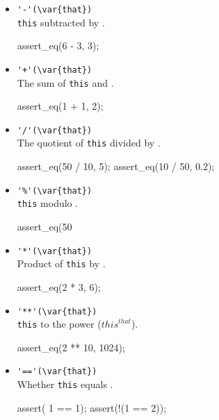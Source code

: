 \begin{itemize}
\item \lstinline|'-'(\var{that})|\\
  \lstinline|this| subtracted by .
\begin{urbiscript}[firstnumber=last]
assert_eq(6 - 3, 3);
\end{urbiscript}

\item \lstinline|'+'(\var{that})|\\
  The sum of \lstinline|this| and .
\begin{urbiscript}[firstnumber=last]
assert_eq(1 + 1, 2);
\end{urbiscript}

\item \lstinline|'/'(\var{that})|\\
  The quotient of \lstinline|this| divided by .
\begin{urbiscript}[firstnumber=last]
assert_eq(50 / 10, 5);
assert_eq(10 / 50, 0.2);
\end{urbiscript}

\item \lstinline|'%'(\var{that})|\\
  \lstinline|this| modulo .
\begin{urbiscript}[firstnumber=last]
assert_eq(50 %
\end{urbiscript}

\item \lstinline|'*'(\var{that})|\\
  Product of \lstinline|this| by .
\begin{urbiscript}[firstnumber=last]
assert_eq(2 * 3, 6);
\end{urbiscript}

\item \lstinline|'**'(\var{that})|\\
  \lstinline|this| to the  power (${this}^{that}$).
\begin{urbiscript}[firstnumber=last]
assert_eq(2 ** 10, 1024);
\end{urbiscript}

\item \lstinline|'=='(\var{that})|\\
  Whether \lstinline|this| equals .
\begin{urbiscript}[firstnumber=last]
assert(  1 == 1);
assert(!(1 == 2));
\end{urbiscript}
\end{itemize}


